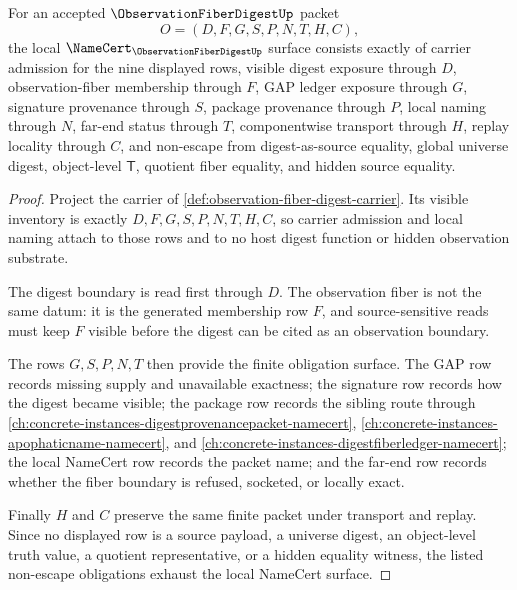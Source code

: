 \begin{theorem}
\label{thm:observation-fiber-digest-namecert-obligations}
For an accepted $\ObservationFiberDigestUp$ packet
$$
O=(D,F,G,S,P,N,T,H,C),
$$
the local $\NameCert_{\ObservationFiberDigestUp}$ surface consists exactly of carrier admission for the nine displayed rows, visible digest exposure through $D$, observation-fiber membership through $F$, GAP ledger exposure through $G$, signature provenance through $S$, package provenance through $P$, local naming through $N$, far-end status through $T$, componentwise transport through $H$, replay locality through $C$, and non-escape from digest-as-source equality, global universe digest, object-level $\mathsf{T}$, quotient fiber equality, and hidden source equality.
\end{theorem}
\begin{proof}
Project the carrier of \autoref{def:observation-fiber-digest-carrier}. Its visible inventory is exactly $D,F,G,S,P,N,T,H,C$, so carrier admission and local naming attach to those rows and to no host digest function or hidden observation substrate.

The digest boundary is read first through $D$. The observation fiber is not the same datum: it is the generated membership row $F$, and source-sensitive reads must keep $F$ visible before the digest can be cited as an observation boundary.

The rows $G,S,P,N,T$ then provide the finite obligation surface. The GAP row records missing supply and unavailable exactness; the signature row records how the digest became visible; the package row records the sibling route through \autoref{ch:concrete-instances-digestprovenancepacket-namecert}, \autoref{ch:concrete-instances-apophaticname-namecert}, and \autoref{ch:concrete-instances-digestfiberledger-namecert}; the local NameCert row records the packet name; and the far-end row records whether the fiber boundary is refused, socketed, or locally exact.

Finally $H$ and $C$ preserve the same finite packet under transport and replay. Since no displayed row is a source payload, a universe digest, an object-level truth value, a quotient representative, or a hidden equality witness, the listed non-escape obligations exhaust the local NameCert surface.
\end{proof}

